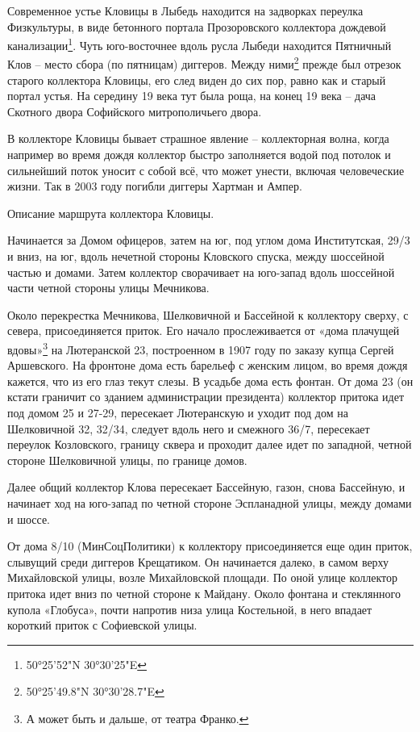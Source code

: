 Современное устье Кловицы в Лыбедь находится на задворках переулка Физкультуры, в виде бетонного портала Прозоровского коллектора дождевой канализации\footnote{50°25'52"N 30°30'25"E}. Чуть юго-восточнее вдоль русла Лыбеди находится Пятничный Клов – место сбора (по пятницам) диггеров. Между ними\footnote{50°25'49.8"N 30°30'28.7"E} прежде был отрезок старого коллектора Кловицы, его след виден до сих пор, равно как и старый портал устья. На середину 19 века тут была роща, на конец 19 века – дача Скотного двора Софийского митрополичьего двора.

В коллекторе Кловицы бывает страшное явление – коллекторная волна, когда например во время дождя коллектор быстро заполняется водой под потолок и сильнейший поток уносит с собой всё, что может унести, включая человеческие жизни. Так в 2003 году погибли диггеры Хартман и Ампер.

Описание маршрута коллектора Кловицы.

Начинается за Домом офицеров, затем на юг, под углом дома Институтская, 29/3 и вниз, на юг, вдоль нечетной стороны Кловского спуска, между шоссейной частью и домами. Затем коллектор сворачивает на юго-запад вдоль шоссейной части четной стороны улицы Мечникова.

Около перекрестка Мечникова, Шелковичной и Бассейной к коллектору сверху, с севера, присоединяется приток. Его начало прослеживается от «дома плачущей вдовы»\footnote{А может быть и дальше, от театра Франко.} на Лютеранской 23, построенном в 1907 году по заказу купца Сергей Аршевского. На фронтоне дома есть барельеф с женским лицом, во время дождя кажется, что из его глаз текут слезы. В усадьбе дома есть фонтан.
От дома 23 (он кстати граничит со зданием администрации президента) коллектор притока идет под домом 25 и 27-29, пересекает Лютеранскую и уходит под дом на Шелковичной 32, 32/34, следует вдоль него и смежного 36/7, пересекает переулок Козловского, границу сквера и проходит далее идет по западной, четной стороне Шелковичной улицы, по границе домов.

Далее общий коллектор Клова пересекает Бассейную, газон, снова Бассейную, и начинает ход на юго-запад по четной стороне Эспланадной улицы, между домами и шоссе.

От дома 8/10 (МинСоцПолитики) к коллектору присоединяется еще один приток, слывущий среди диггеров Крещатиком. Он начинается далеко, в самом верху Михайловской улицы, возле Михайловской площади. По оной улице коллектор притока идет вниз по четной стороне к Майдану. Около фонтана и стеклянного купола «Глобуса», почти напротив низа улица Костельной, в него впадает короткий приток с Софиевской улицы.

